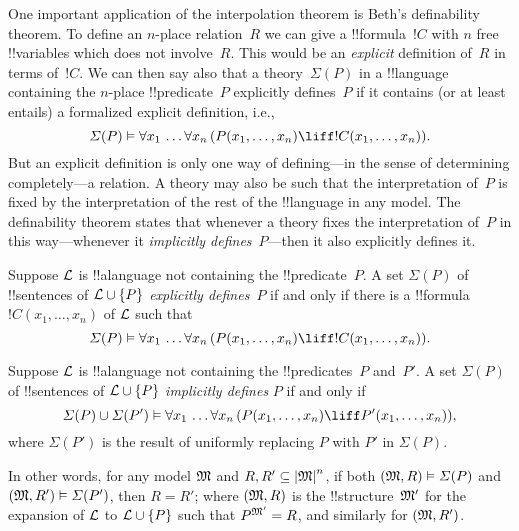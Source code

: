 \documentclass[../../../include/open-logic-section]{subfiles}
\begin{document}


One important application of the interpolation theorem is Beth's
definability theorem.  To define an $n$-place relation~$R$ we can give
a !!{formula}~$!C$ with $n$ free !!{variable}s which does not
involve~$R$. This would be an \emph{explicit} definition of~$R$ in
terms of~$!C$.  We can then say also that a theory~$\Sigma(P)$ in a
!!{language} containing the $n$-place !!{predicate}~$P$ explicitly
defines~$P$ if it contains (or at least entails) a formalized explicit
definition, i.e.,
\[
\Sigma(P) \Entails \lforall[x_1][\dots
  \lforall[x_n][(\Atom{P}{x_1,\dots, x_n} \liff !C(x_1, \dots,
    x_n))]].
\]
But an explicit definition is only one way of defining---in the sense
of determining completely---a relation.  A theory may also be such
that the interpretation of~$P$ is fixed by the interpretation of the
rest of the !!{language} in any model.  The definability theorem
states that whenever a theory fixes the interpretation of~$P$ in this
way---whenever it \emph{implicitly defines}~$P$---then it also
explicitly defines it.

\begin{defn}
Suppose $\Lang{L}$ is !!a{language} not containing the
!!{predicate}~$P$.  A set $\Sigma(P)$ of !!{sentence}s of $\Lang{L}
\cup \{P\}$ \emph{explicitly defines}~$P$ if and only if there is a
!!{formula} $!C(x_1, \dots, x_n)$ of $\Lang{L}$ such that
\[
\Sigma(P) \Entails \lforall[x_1][\dots
  \lforall[x_n][(\Atom{P}{x_1,\dots, x_n} \liff !C(x_1, \dots,
    x_n))]].
\]
\end{defn}

\begin{defn}
Suppose $\Lang{L}$ is !!a{language} not containing the
!!{predicate}s~$P$ and~$P'$.  A set $\Sigma(P)$ of !!{sentence}s of
$\Lang{L} \cup \{P\}$ \emph{implicitly defines} $P$ if and only if
\[
\Sigma(P) \cup \Sigma(P') \Entails \lforall[x_1][\dots
  \lforall[x_n][(\Atom{P}{x_1,\dots, x_n} \liff \Atom{P'}{x_1,\dots,
      x_n})]],
\]
where $\Sigma(P')$ is the result of uniformly replacing $P$ with $P'$
in $\Sigma(P)$.
\end{defn}

In other words, for any model $\Struct{M}$ and $R, R' \subseteq
\Domain{M}^n$, if both $\Expan{M}{R} \Entails \Sigma(P)$ and
$\Expan{M}{R'} \Entails \Sigma(P')$, then $R=R'$; where
$\Expan{M}{R}$ is the !!{structure}~$\Struct{M'}$ for the
expansion of $\Lang{L}$ to $\Lang{L} \cup \{P\}$ such that
$\Assign{P}{M'} = R$, and similarly for $\Expan{M}{R'}$.
\end{document}
